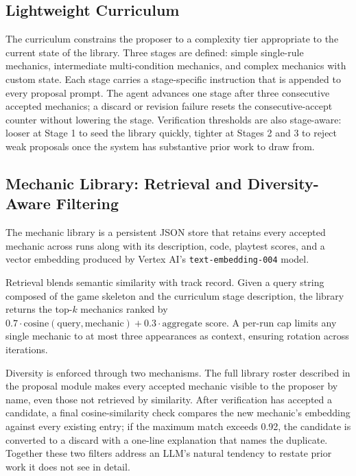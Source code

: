 \documentclass[conference]{IEEEtran}
\begin{document}
  \subsection{Lightweight Curriculum}                           
                                                                                
  The curriculum constrains the proposer to a complexity tier appropriate to the
   current state of the library. Three stages are defined: simple single-rule   
  mechanics, intermediate multi-condition mechanics, and complex mechanics with
  custom state. Each stage carries a stage-specific instruction that is appended
   to every proposal prompt. The agent advances one stage after three         
  consecutive accepted mechanics; a discard or revision failure resets the
  consecutive-accept counter without lowering the stage. Verification thresholds
   are also stage-aware: looser at Stage 1 to seed the library quickly, tighter 
  at Stages 2 and 3 to reject weak proposals once the system has substantive    
  prior work to draw from.   

\subsection{Mechanic Library: Retrieval and Diversity-Aware Filtering}        
                                                                              
  The mechanic library is a persistent JSON store that retains every accepted   
  mechanic across runs along with its description, code, playtest scores, and a
  vector embedding produced by Vertex AI's \texttt{text-embedding-004} model.   
                                                                              
  Retrieval blends semantic similarity with track record. Given a query string
  composed of the game skeleton and the curriculum stage description, the
  library returns the top-$k$ mechanics ranked by $0.7 \cdot
  \text{cosine}(\text{query}, \text{mechanic}) + 0.3 \cdot \text{aggregate      
  score}$. A per-run cap limits any single mechanic to at most three appearances
   as context, ensuring rotation across iterations.                             
                                                                                
  Diversity is enforced through two mechanisms. The full library roster       
  described in the proposal module makes every accepted mechanic visible to the 
  proposer by name, even those not retrieved by similarity. After verification
  has accepted a candidate, a final cosine-similarity check compares the new    
  mechanic's embedding against every existing entry; if the maximum match     
  exceeds 0.92, the candidate is converted to a discard with a one-line
  explanation that names the duplicate. Together these two filters address an
  LLM's natural tendency to restate prior work it does not see in detail.
\end{document}
